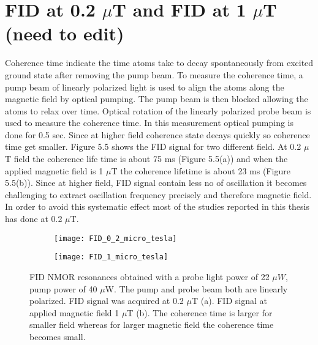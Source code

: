 \documentclass[12pt]{report}
\begin{document}
   \section{FID at 0.2 $\mu$T and FID at 
  1 $\mu$T (need to edit) }
  Coherence time indicate the time atoms take to decay spontaneously from excited ground state after removing the pump beam. To measure the coherence time, a pump beam of linearly polarized light is
used to align the atoms along the magnetic field by optical pumping. The pump
beam is then blocked allowing the atoms to relax over time. Optical rotation of the linearly polarized probe beam is used to measure the coherence time. In this measurement optical pumping is done for 0.5 sec. Since at higher field coherence state decays quickly so coherence time get smaller. Figure 5.5 shows the FID signal for  two different field.  At 0.2 $\mu$T field the coherence life time is about 75 ms (Figure 5.5(a)) and when the applied magnetic field is 1 $\mu$T  the coherence lifetime is about 23 ms (Figure 5.5(b)). Since at higher field, FID signal contain less no of oscillation it becomes challenging to extract oscillation frequency precisely and therefore magnetic field. In order to avoid this systematic effect most of the studies reported in this thesis has done at 0.2 $\mu$T.
   \begin{figure}
    \centering
 
    \begin{subfigure}[b]{0.45\textwidth}
        \centering
        \texttt{[image: FID\_0\_2\_micro\_tesla]}
        \caption{}
        \label{fig:three sin x}
    \end{subfigure}
    \hfill
    \begin{subfigure}[b]{0.45\textwidth}
        \centering
        \texttt{[image: FID\_1\_micro\_tesla]}
        \caption{}
        \label{fig:five over x}
    \end{subfigure}
    \caption{FID NMOR resonances 
obtained with a probe light power of 22 $\mu W$, pump power of 40 $\mu$W. The pump and probe beam both are linearly polarized. FID signal was acquired at 0.2 $\mu$T (a).  FID signal at applied magnetic field 1 $\mu$T (b). The coherence time is larger for smaller field whereas for larger magnetic field the coherence time becomes small. }
    \label{fig:three graphs}
\end{figure}
\end{document}
